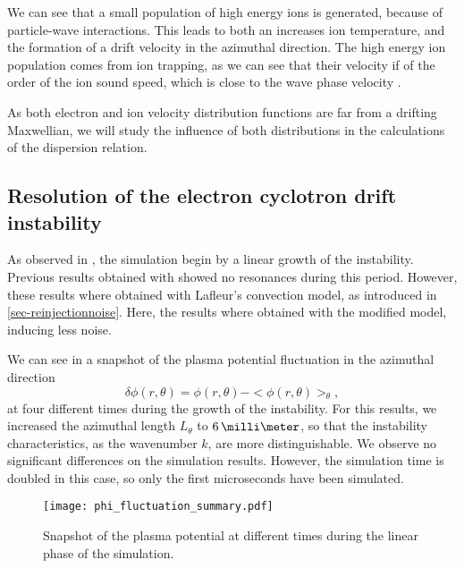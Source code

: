   We can see that a small population of high energy ions is generated, because of particle-wave interactions.
  This leads to both an increases ion temperature, and the formation of a drift velocity in the azimuthal direction.
  The high energy ion population comes from ion trapping, as we can see that their velocity if of the order of the ion sound speed, which is close to the wave phase velocity \citep{lafleur2018}.
  
  \vspace{1em}
  As both electron and ion velocity distribution functions are far from a drifting Maxwellian, we will study the influence of both distributions in the calculations of the dispersion relation.
  
  
  
  \subsection{Resolution of the electron cyclotron drift instability} \label{subsec-ECDIPIC}
  
  
    As observed in , the simulation begin by a linear growth of the instability.
    Previous results obtained with \LPPic \citep{croes2017a} showed no resonances during this period.
    However, these results where obtained with Lafleur's convection model, as introduced in \cref{sec-reinjectionnoise}.
    Here, the results where obtained with the modified model, inducing less noise.
    
    We can see in   a snapshot of the plasma potential fluctuation in the azimuthal direction \[ \delta \phi(r, \theta) = \phi(r, \theta) - < \phi(r, \theta) >_{ \theta}, \]
    at four different times during the growth of the instability.
    For this results, we increased the azimuthal length $L_{\theta}$ to $6\,\milli\meter$, so that the instability characteristics, as the wavenumber $k$, are more distinguishable.
    We observe no significant differences on the simulation results.
    However, the simulation time is doubled in this case, so only the first microseconds have been simulated.
    

    
    \begin{figure}[hbtp]
      \centering
      \texttt{[image: phi\_fluctuation\_summary.pdf]}
      \caption{Snapshot of the plasma potential at different times during the linear phase of the simulation.}
      \label{fig-phi_fluctuation_summary}
    \end{figure}
    
